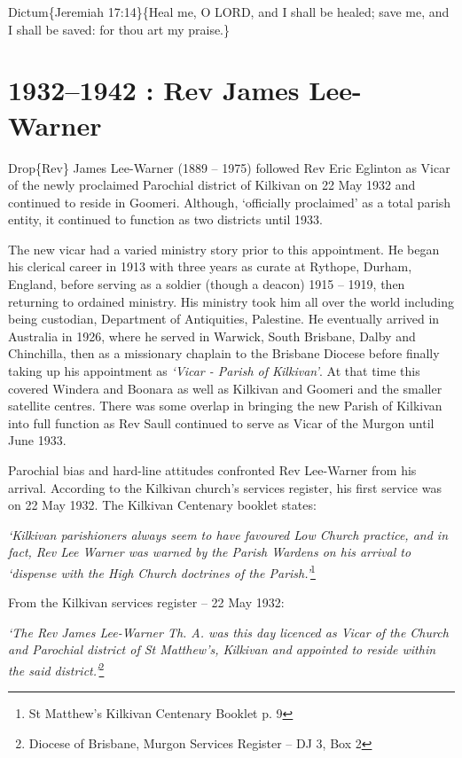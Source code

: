 Dictum\{Jeremiah 17:14\}\{Heal me, O LORD, and I shall be healed; save me, and I shall be saved: for thou art my praise.\}

\hypertarget{rev-james-lee-warner}{%
\chapter{1932--1942 : Rev James Lee-Warner}\label{rev-james-lee-warner}}

Drop\{Rev\} James Lee-Warner (1889 -- 1975) followed Rev Eric Eglinton as Vicar of the newly proclaimed Parochial district of Kilkivan on 22 May 1932 and continued to reside in Goomeri. Although, `officially proclaimed' as a total parish entity, it continued to function as two districts until 1933.

The new vicar had a varied ministry story prior to this appointment. He began his clerical career in 1913 with three years as curate at Rythope, Durham, England, before serving as a soldier (though a deacon) 1915 -- 1919, then returning to ordained ministry. His ministry took him all over the world including being custodian, Department of Antiquities, Palestine. He eventually arrived in Australia in 1926, where he served in Warwick, South Brisbane, Dalby and Chinchilla, then as a missionary chaplain to the Brisbane Diocese before finally taking up his appointment as \emph{`Vicar - Parish of Kilkivan'}. At that time this covered Windera and Boonara as well as Kilkivan and Goomeri and the smaller satellite centres. There was some overlap in bringing the new Parish of Kilkivan into full function as Rev Saull continued to serve as Vicar of the Murgon until June 1933.

Parochial bias and hard-line attitudes confronted Rev Lee-Warner from his arrival. According to the Kilkivan church's services register, his first service was on 22 May 1932. The Kilkivan Centenary booklet states:

\emph{`Kilkivan parishioners always seem to have favoured Low Church practice, and in fact, Rev Lee Warner was warned by the Parish Wardens on his arrival to `dispense with the High Church doctrines of the Parish.'}\footnote{St Matthew's Kilkivan Centenary Booklet p. 9}

From the Kilkivan services register -- 22 May 1932:

\emph{`The Rev James Lee-Warner Th. A. was this day licenced as Vicar of the Church and Parochial district of St Matthew's, Kilkivan and appointed to reside within the said district.'}\footnote{Diocese of Brisbane, Murgon Services Register -- DJ 3, Box 2}


